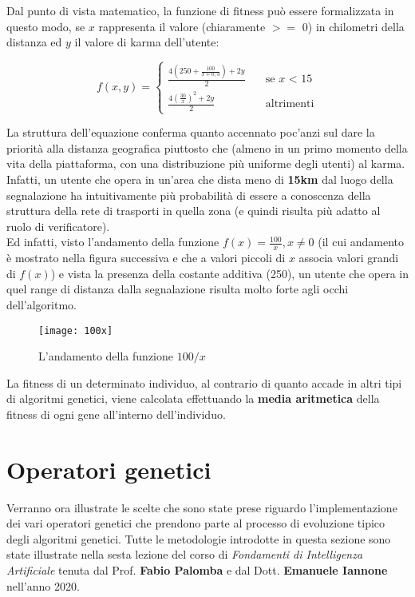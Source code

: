     Dal punto di vista matematico, la funzione di fitness può essere formalizzata in questo modo, se $x$ rappresenta il valore (chiaramente $>=$ 0) in chilometri della distanza ed $y$ il valore di karma dell'utente:

    \[ f(x, y) =
  \begin{cases}
    \frac{4(250 + \frac{100}{x+0,3}) + 2y}{2}      & \quad \text{se } x \text{ < 15}\\
    \frac{4(\frac{30}{x})^2 + 2y}{2}  & \quad \text{altrimenti}
  \end{cases}
\]

La struttura dell'equazione conferma quanto accennato poc'anzi sul dare la priorità alla distanza geografica piuttosto che (almeno in un primo momento della vita della piattaforma, con una distribuzione più uniforme degli utenti) al karma. Infatti, un utente che opera in un'area che dista meno di \textbf{15km} dal luogo della segnalazione ha intuitivamente più probabilità di essere a conoscenza della struttura della rete di trasporti in quella zona (e quindi risulta più adatto al ruolo di verificatore). \\
Ed infatti, visto l'andamento della funzione $f(x) = \frac{100}{x}, x \neq 0$ (il cui andamento è mostrato nella figura successiva e che a valori piccoli di $x$ associa valori grandi di $f(x)$) e vista la presenza della costante additiva (250), un utente che opera in quel range di distanza dalla segnalazione risulta molto forte agli occhi dell'algoritmo.
\begin{figure}[h!]
    \begin{center}
        \texttt{[image: 100x]}
    \end{center}
    \caption{L'andamento della funzione $100/x$}
    \label{fig: L'andamento della funzione $100/x$}
\end{figure}

La fitness di un determinato individuo, al contrario di quanto accade in altri tipi di algoritmi genetici, viene calcolata effettuando la \textbf{media aritmetica} della fitness di ogni gene all'interno dell'individuo. 

\section{Operatori genetici}
  Verranno ora illustrate le scelte che sono state prese riguardo l'implementazione dei vari operatori genetici che prendono parte al processo di evoluzione tipico degli algoritmi genetici. Tutte le metodologie introdotte in questa sezione sono state illustrate nella sesta lezione del corso di \textit{Fondamenti di Intelligenza Artificiale} tenuta dal Prof. \textbf{Fabio Palomba} e dal Dott. \textbf{Emanuele Iannone} nell'anno 2020.

